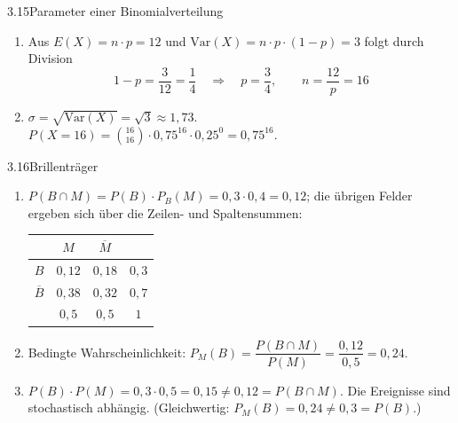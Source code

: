 \begin{loesung}{3.15}{Parameter einer Binomialverteilung}
\begin{enumerate}[label=\alph*)]
  \item Aus $E(X) = n\cdot p = 12$ und $\text{Var}(X) = n\cdot p\cdot(1-p) = 3$ folgt durch Division
  \[1-p = \dfrac{3}{12} = \dfrac{1}{4}\quad\Longrightarrow\quad p = \dfrac{3}{4},\qquad n = \dfrac{12}{p} = 16\]
  \item $\sigma = \sqrt{\text{Var}(X)} = \sqrt{3}\approx 1{,}73$.\\
  $P(X=16) = \binom{16}{16}\cdot 0{,}75^{16}\cdot 0{,}25^0 = 0{,}75^{16}$.
\end{enumerate}
\end{loesung}

\begin{loesung}{3.16}{Brillenträger}
\begin{enumerate}[label=\alph*)]
  \item $P(B\cap M) = P(B)\cdot P_B(M) = 0{,}3\cdot 0{,}4 = 0{,}12$; die übrigen Felder ergeben sich über die Zeilen- und Spaltensummen:
  \begin{center}
  \begin{tabular}{c|c|c|c}
            & $M$      & $\overline{M}$ & \\ \hline
  $B$       & $0{,}12$ & $0{,}18$ & $0{,}3$ \\ \hline
  $\overline{B}$ & $0{,}38$ & $0{,}32$ & $0{,}7$ \\ \hline
            & $0{,}5$  & $0{,}5$  & $1$
  \end{tabular}
  \end{center}
  \item Bedingte Wahrscheinlichkeit: $P_M(B) = \dfrac{P(B\cap M)}{P(M)} = \dfrac{0{,}12}{0{,}5} = 0{,}24$.
  \item $P(B)\cdot P(M) = 0{,}3\cdot 0{,}5 = 0{,}15\neq 0{,}12 = P(B\cap M)$. Die Ereignisse sind stochastisch abhängig. (Gleichwertig: $P_M(B) = 0{,}24\neq 0{,}3 = P(B)$.)
\end{enumerate}
\end{loesung}


